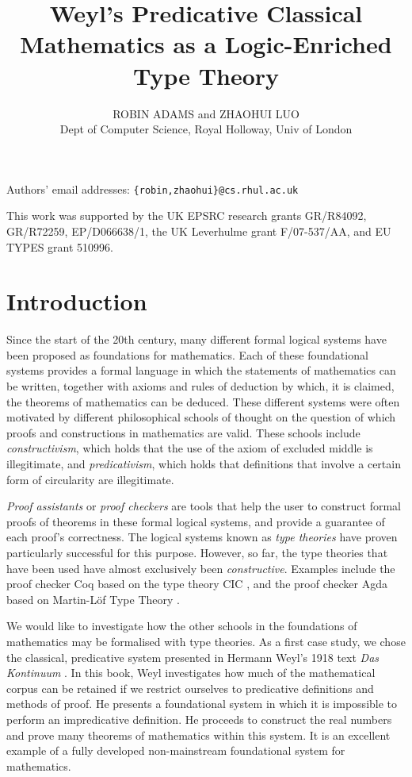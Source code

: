 \documentclass[acmtocl]{acmtrans2m}
\title{Weyl's Predicative Classical Mathematics as a Logic-Enriched Type Theory}
\author{ROBIN ADAMS and ZHAOHUI LUO \\ Dept of Computer Science, Royal Holloway, Univ of London}
\begin{document}
\begin{bottomstuff}
Authors' email addresses: \texttt{\{robin,zhaohui\}@cs.rhul.ac.uk}

This work was supported by the UK EPSRC research grants
GR/R84092, GR/R72259, EP/D066638/1, the UK Leverhulme grant F/07-537/AA, and EU TYPES grant 510996.
\end{bottomstuff}

\maketitle
{}

\section{Introduction}
Since the start of the 20th century, many different formal logical systems have been proposed as foundations for mathematics.  Each of these foundational systems provides a formal language in which the statements of mathematics can be written, together with axioms and rules of deduction by which, it is claimed, the theorems of mathematics can be deduced.  These different systems were often motivated by different philosophical schools of thought on the question of which proofs and constructions in mathematics are valid.  These schools include \emph{constructivism}, which holds that the use of the axiom of excluded middle is illegitimate, and \emph{predicativism}, which holds that definitions that involve a certain form of circularity are illegitimate.

\emph{Proof assistants} or \emph{proof checkers} are tools that help the user to construct formal proofs of theorems in these formal logical systems, and provide a guarantee of each proof's correctness.  The logical systems known as \emph{type theories} have proven particularly successful for this purpose.  However, so far,
the type theories that have been used have almost exclusively been \emph{constructive}.  Examples include the proof checker Coq \cite{Coq:manual} based on the type theory CIC \cite{coq'art}, and the proof checker Agda \cite{norell:thesis} based on Martin-L\"of Type Theory \cite{pmltt}.


We would like to investigate how the other schools in the foundations of mathematics may be formalised with type theories.  As a first case study, we chose the classical, predicative system presented in Hermann Weyl's 1918 text \emph{Das Kontinuum} \cite{weyl:kontinuum}.  In this book, Weyl investigates how much of the mathematical corpus can be retained if we restrict ourselves to predicative definitions and methods of proof.  He presents a foundational system in which it is impossible to perform an impredicative definition.  He proceeds to construct the real numbers and prove many theorems of mathematics within this system.  It is an excellent example of a fully developed non-mainstream foundational system for mathematics.
\end{document}
